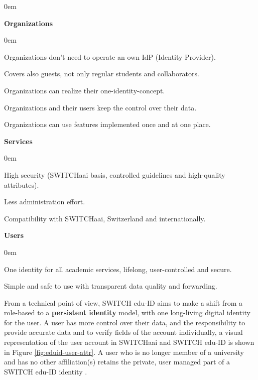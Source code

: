 \begin{description}
	\itemsep0em
	\item \textbf{Organizations} 
		\begin{description}
			\itemsep0em
			\item Organizations don't need to operate an own IdP (Identity Provider).
			\item Covers also guests, not only regular students and collaborators.
			\item Organizations can realize their one-identity-concept.
			\item Organizations and their users keep the control over their data.
			\item Organizations can use features implemented once and at one place. \cite{eduid-for-organizations}
		\end{description}
	\item \textbf{Services}
		\begin{description}
			\itemsep0em
			\item High security (SWITCHaai basis, controlled guidelines and high-quality attributes).
			\item Less administration effort.
			\item Compatibility with SWITCHaai, Switzerland and internationally. \cite{eduid-for-services}
		\end{description}
	\item \textbf{Users}
		\begin{description}
			\itemsep0em
			\item One identity for all academic services, lifelong, user-controlled and secure.
			\item Simple and safe to use with transparent data quality and forwarding. \cite{eduid-for-users}
		\end{description}
\end{description}

From a technical point of view, SWITCH edu-ID aims to make a shift from a role-based to a \textbf{persistent identity} model, with one long-living digital identity for the user. A user has more control over their data, and the responsibility to provide accurate data and to verify fields of the account individually, a visual representation of the user account in SWITCHaai and SWITCH edu-ID is shown in Figure \ref{fig:eduid-user-attr}. A user who is no longer member of a university and has no other affiliation(s) retains the private, user managed part of a SWITCH edu-ID identity \cite{eduid-architecture}.

